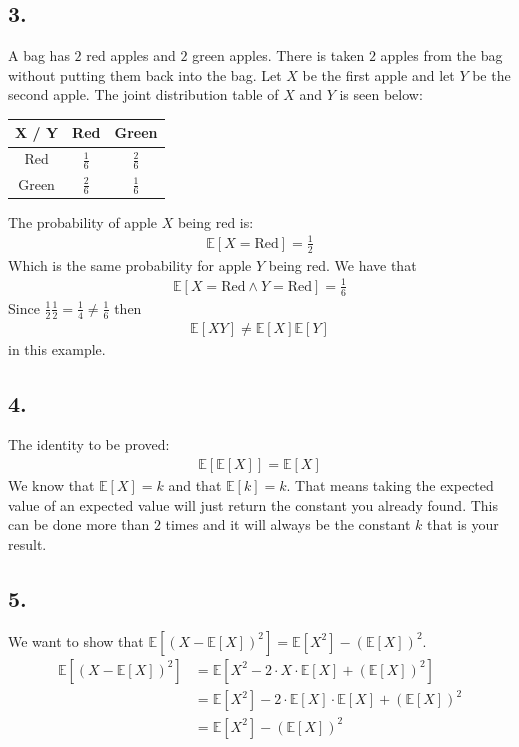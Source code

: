 \documentclass[a4paper]{article}
\def\E{\mathbb{E}}
\begin{document}
\subsection*{3.}
A bag has $2$ red apples and $2$ green apples. There is taken $2$ apples from the bag without putting them back into the bag. Let $X$ be the first apple and let $Y$ be the second apple. The joint distribution table of $X$ and $Y$ is seen below:
\begin{center}
\begin{tabular}{|c||c|c|}
\hline
X / Y & Red & Green \\
\hline
\hline
Red & $\frac{1}{6}$  & $\frac{2}{6}$ \\
\hline
Green & $\frac{2}{6}$ & $\frac{1}{6}$\\
\hline
\end{tabular}
\end{center}
The probability of apple $X$ being red is:
\begin{align*}
\mathbb{E}[X=\mbox{Red}] = \frac{1}{2}
\end{align*}
Which is the same probability for apple $Y$ being red. We have that
\begin{align*}
\mathbb{E}[X=\mbox{Red} \land Y=\mbox{Red}]=\frac{1}{6}
\end{align*}
Since $\frac{1}{2}\frac{1}{2} = \frac{1}{4}\neq\frac{1}{6}$ then
\begin{align*}
\mathbb{E}[XY]\neq \mathbb{E}[X]\mathbb{E}[Y]
\end{align*}
in this example.

\subsection*{4.}
The identity to be proved:
\begin{align*}
\mathbb{E}[\mathbb{E}[X]]=\mathbb{E}[X]
\end{align*}
We know that $\mathbb{E}[X]=k$ and that $\mathbb{E}[k]=k$. That means taking the expected value of an expected value will just return the constant you already found. This can be done more than $2$ times and it will always be the constant $k$ that is your result.

\subsection*{5.}
We want to show that $\E[(X-\E[X])^2] = \E[X^2]-(\E[X])^2.$
\begin{align*}
  \E[(X-\E[X])^2] &= \E[X^2 - 2\cdot X \cdot \E[X]+ (\E[X])^2]\\
                  &= \E[X^2] - 2\cdot \E[X] \cdot \E[X] + (\E[X])^2\\
                  &= \E[X^2]-(\E[X])^2
\end{align*}
\end{document}

